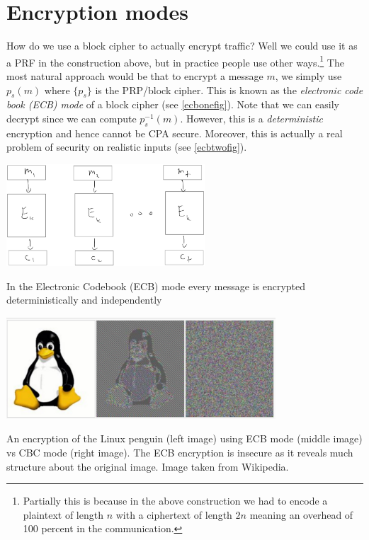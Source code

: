 \section{Encryption modes}\label{Encryption-modes}

How do we use a block cipher to actually encrypt traffic? Well we could
use it as a PRF in the construction above, but in practice people use
other ways.\footnote{Partially this is because in the above construction
  we had to encode a plaintext of length \(n\) with a ciphertext of
  length \(2n\) meaning an overhead of 100 percent in the communication.}
The most natural approach would be that to encrypt a message \(m\), we
simply use \(p_s(m)\) where \(\{ p_s \}\) is the PRP/block cipher. This
is known as the \emph{electronic code book (ECB) mode} of a block cipher
(see \cref{ecbonefig}). Note that we can easily decrypt since we can
compute \(p_s^{-1}(m)\). However, this is a \emph{deterministic}
encryption and hence cannot be CPA secure. Moreover, this is actually a
real problem of security on realistic inputs (see \cref{ecbtwofig}).


\begin{marginfigure}
\centering
\includegraphics[width=\linewidth, height=1.5in, keepaspectratio]{../figure/ecb-mode.jpg}
\caption{In the Electronic Codebook (ECB) mode every message is
encrypted deterministically and independently}
\label{ecbonefig}
\end{marginfigure}


\begin{marginfigure}
\centering
\includegraphics[width=\linewidth, height=1.5in, keepaspectratio]{../figure/ECB_prob.jpg}
\caption{An encryption of the Linux penguin (left image) using ECB mode
(middle image) vs CBC mode (right image). The ECB encryption is insecure
as it reveals much structure about the original image. Image taken from
Wikipedia.}
\label{ecbtwofig}
\end{marginfigure}

